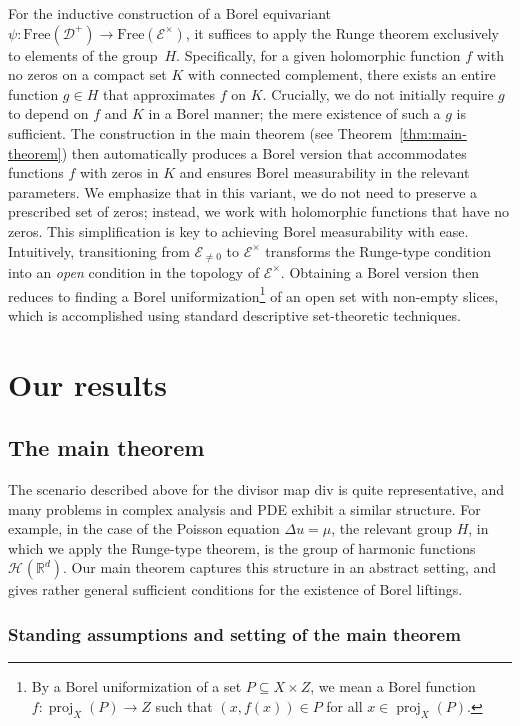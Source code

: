 \documentclass[12pt]{paper}
\numberwithin{equation}{section}
\theoremstyle{plain}
\theoremstyle{definition}
\newcommand{\Rd}{\mathbb{R}^{d}}
\newcommand{\holomnz}[1][]{\mathcal{E}^{\times}_{#1}}
\newcommand{\holom}[1][]{\mathcal{E}_{#1}}
\newcommand{\divis}[1][]{\mathcal{D}_{#1}}
\newcommand{\divisp}[1][]{\divis[#1]^{+}}
\newcommand{\harm}[2][]{\mathcal{H}_{#1}(#2)}
\newcommand{\dm}{\mathrm{div}}      %
\DeclareMathOperator{\proj}{\mathrm{proj}}
\newcommand{\free}{\mathrm{Free}}
\begin{document}
For the inductive construction of a Borel equivariant \(\psi : \free(\divisp) \to \free(\holomnz)\),
it suffices to apply the Runge theorem exclusively to elements of the group~\(H\).  Specifically,
for a given holomorphic function \(f\) with no zeros on a compact set \(K\) with connected
complement, there exists an entire function \(g \in H\) that approximates \(f\) on \(K\).
Crucially, we do not initially require \(g\) to depend on \(f\) and \(K\) in a Borel manner; the
mere existence of such a \(g\) is sufficient.  The construction in the main theorem
(see Theorem~\ref{thm:main-theorem}) then automatically produces a Borel version that accommodates
functions \(f\) with zeros in \(K\) and ensures Borel measurability in the relevant parameters.  We
emphasize that in this variant, we do not need to preserve a prescribed set of zeros; instead, we
work with holomorphic functions that have no zeros.  This simplification is key to achieving Borel
measurability with ease.  Intuitively, transitioning from \(\holom[\ne 0]\) to \(\holomnz\)
transforms the Runge-type condition into an \emph{open} condition in the topology of \(\holomnz\).
Obtaining a Borel version then reduces to finding a Borel uniformization\footnote{ By a Borel
  uniformization of a set \(P\subseteq X\times Z\), we mean a Borel function
  \(f : \proj_X(P) \to Z\) such that \((x, f(x)) \in P\) for all \(x \in \proj_X(P)\).} of an open
set with non-empty slices, which is accomplished using standard descriptive set-theoretic
techniques.


\section{Our results}
\subsection{The main theorem}
\label{sec:main-theorem-description}
The scenario described above for the divisor map \(\dm\) is quite representative, and many problems
in complex analysis and PDE exhibit a similar structure.  For example, in the case of the Poisson
equation \(\Delta u = \mu\), the relevant group \(H\), in which we apply the Runge-type theorem, is the
group of harmonic functions \(\harm{\Rd}\).  Our main theorem captures this structure in an abstract
setting, and gives rather general sufficient conditions for the existence of Borel liftings.


\subsubsection{Standing assumptions and setting of the main theorem}
\label{sec:standing_assumptions}
\end{document}
